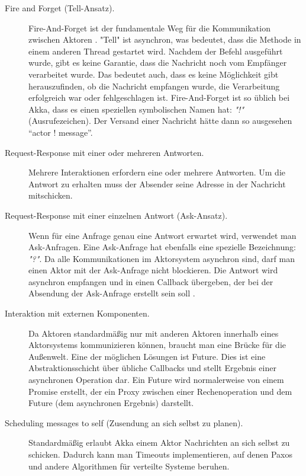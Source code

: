 \begin{description} 
	\item[Fire and Forget (Tell-Ansatz).] Fire-And-Forget ist der fundamentale Weg für die Kommunikation zwischen Aktoren \cite{akka}. "Tell" ist asynchron, was bedeutet, dass die Methode in einem anderen Thread gestartet wird. Nachdem der Befehl ausgeführt wurde, gibt es keine Garantie, dass die Nachricht noch vom Empfänger verarbeitet wurde. Das bedeutet auch, dass es keine Möglichkeit gibt herauszufinden, ob die Nachricht empfangen wurde, die Verarbeitung erfolgreich war oder fehlgeschlagen ist. Fire-And-Forget ist so üblich bei Akka, dass es einen speziellen symbolischen Namen hat: \textit{"!"} (Ausrufezeichen). Der Versand einer Nachricht hätte dann so ausgesehen “actor ! message”.
	
	\item[Request-Response mit einer oder mehreren Antworten.] Mehrere Interaktionen erfordern eine oder mehrere Antworten. Um die Antwort zu erhalten muss der Absender seine Adresse in der Nachricht mitschicken.
	
	\item[Request-Response mit einer einzelnen Antwort (Ask-Ansatz).] Wenn für eine Anfrage genau eine Antwort erwartet wird, verwendet man Ask-Anfragen. Eine Ask-Anfrage hat ebenfalls eine spezielle Bezeichnung: \textit{"?"}. Da alle Kommunikationen im Aktorsystem asynchron sind, darf man einen Aktor mit der Ask-Anfrage nicht blockieren. Die Antwort wird asynchron empfangen und in einen Callback übergeben, der bei der Absendung der Ask-Anfrage erstellt sein soll \cite{akka}.
	
	\item[Interaktion mit externen Komponenten.] Da Aktoren standardmäßig nur mit anderen Aktoren innerhalb eines Aktorsystems kommunizieren können, braucht man eine Brücke für die Außenwelt. Eine der möglichen Lösungen ist Future. Dies ist eine Abstraktionsschicht über übliche Callbacks und stellt Ergebnis einer asynchronen Operation dar. Ein Future wird normalerweise von einem Promise erstellt, der ein Proxy zwischen einer Rechenoperation und dem Future (dem asynchronen Ergebnis) darstellt.
	
	\item[Scheduling messages to self (Zusendung an sich selbst zu planen).] Standardmäßig erlaubt Akka einem Aktor Nachrichten an sich selbst zu schicken. Dadurch kann man Timeouts implementieren, auf denen Paxos und andere Algorithmen für verteilte Systeme beruhen.
\end{description}

